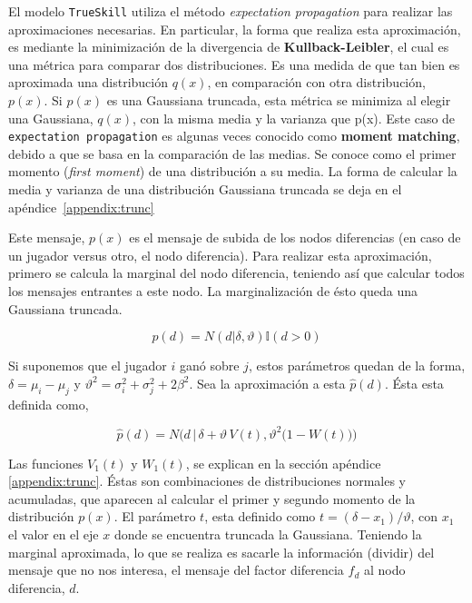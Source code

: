 \documentclass[11pt,twoside, spanish]{report} %
\begin{document}
El modelo \texttt{TrueSkill} utiliza el m\'etodo \textit{expectation propagation} para realizar las aproximaciones necesarias.
En particular, la forma que realiza esta aproximaci\'on, es mediante la minimizaci\'on de la divergencia de \textbf{Kullback-Leibler}, el cual es una m\'etrica para comparar dos distribuciones.
Es una medida de que tan bien es aproximada una distribuci\'on $q(x)$, en comparaci\'on con otra distribuci\'on, $p(x)$.
Si $p(x)$ es una Gaussiana truncada, esta m\'etrica se minimiza al elegir una Gaussiana,  $q(x)$, con la misma media y la varianza que p(x).
Este caso de \texttt{expectation propagation} es algunas veces conocido como \textbf{moment matching}, debido a que se basa en la comparaci\'on  de las medias.
Se conoce como el primer momento (\textit{first moment}) de una distribuci\'on a su media.
La forma de calcular la media y varianza de una distribuci\'on Gaussiana truncada se deja en el ap\'endice~\ref{appendix:trunc}


Este mensaje, $p(x)$ es el mensaje de subida de los nodos diferencias (en caso de un jugador versus otro,  el nodo diferencia).
Para realizar esta aproximaci\'on, primero se calcula la marginal del nodo diferencia, teniendo as\'i que calcular todos los mensajes entrantes a este nodo.
La marginalizaci\'on de \'esto queda una Gaussiana truncada.

\begin{equation}
	p(d) = N(d|\delta,\vartheta) \mathbb{I}(d > 0)
\end{equation}

Si suponemos que el jugador $i$ gan\'o sobre $j$, estos par\'ametros quedan de la forma, $\delta = \mu_{i}-\mu_{j}$ y
$\vartheta^2 = \sigma_i^2 + \sigma_j^2+2\beta^2$.
Sea la aproximaci\'on a esta $\widehat{p}(d)$.
\'Esta esta definida como,

\begin{equation}\label{eq:aprox}
\widehat{p}(d) = N\Bigg(d \,  \bigg| \,  \delta + \vartheta \, V(t) ,  \vartheta^2 \big( 1 - W(t) \big)  \Bigg)
\end{equation}


Las funciones $V_1(t)$ y $W_1(t)$, se explican en la secci\'on ap\'endice \ref{appendix:trunc}.
\'Estas son combinaciones de distribuciones normales y acumuladas, que aparecen al calcular el primer y segundo momento de la distribuci\'on $p(x)$.
El par\'ametro $t$, esta definido como $t = (\delta-x_1)/\vartheta$, con $x_1$ el valor en el eje $x$ donde se encuentra truncada la Gaussiana.
Teniendo la marginal aproximada, lo que se realiza es sacarle la informaci\'on (dividir) del mensaje que no nos interesa, el mensaje del factor diferencia $f_d$ al nodo diferencia, $d$.
\end{document}
